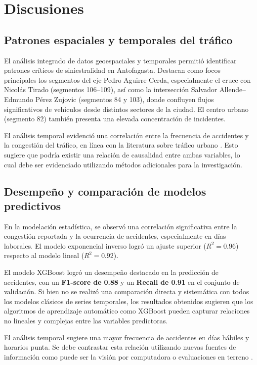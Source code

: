 \documentclass[12pt]{article}
\begin{document}
\section{Discusiones}

\subsection{Patrones espaciales y temporales del tráfico}

El análisis integrado de datos geoespaciales y temporales permitió identificar patrones críticos de siniestralidad en Antofagasta. Destacan como focos principales los segmentos del eje Pedro Aguirre Cerda, especialmente el cruce con Nicolás Tirado (segmentos 106–109), así como la intersección Salvador Allende–Edmundo Pérez Zujovic (segmentos 84 y 103), donde confluyen flujos significativos de vehículos desde distintos sectores de la ciudad. El centro urbano (segmento 82) también presenta una elevada concentración de incidentes.

El análisis temporal evidenció una correlación entre la frecuencia de accidentes y la congestión del tráfico, en línea con la literatura sobre tráfico urbano \citep{berhanu2024}. Esto sugiere que podría existir una relación de causalidad entre ambas variables, lo cual debe ser evidenciado utilizando métodos adicionales para la investigación.

\subsection{Desempeño y comparación de modelos predictivos}

En la modelación estadística, se observó una correlación significativa entre la congestión reportada y la ocurrencia de accidentes, especialmente en días laborales. El modelo exponencial inverso logró un ajuste superior ($R^2 = 0.96$) respecto al modelo lineal ($R^2 = 0.92$).

El modelo XGBoost logró un desempeño destacado en la predicción de accidentes, con un \textbf{F1-score de 0.88} y un \textbf{Recall de 0.91} en el conjunto de validación. Si bien no se realizó una comparación directa y sistemática con todos los modelos clásicos de series temporales, los resultados obtenidos sugieren que los algoritmos de aprendizaje automático como XGBoost pueden capturar relaciones no lineales y complejas entre las variables predictoras.

El análisis temporal sugiere una mayor frecuencia de accidentes en días hábiles y horarios punta. Se debe contrastar esta relación utilizando nuevas fuentes de información como puede ser la visión por computadora o evaluaciones en terreno \citep{goodall2019}.
\end{document}
